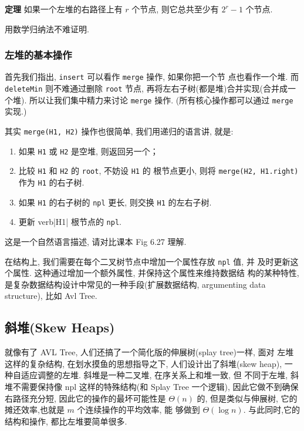 \documentclass[a4paper]{ctexart}
\theoremstyle{definition}
\theoremstyle{definition}
\begin{document}
{\bf 定理} 如果一个左堆的右路径上有 $r$ 个节点, 则它总共至少有 $2^r -
1$ 个节点.

用数学归纳法不难证明. 

\subsubsection{左堆的基本操作}

首先我们指出, \verb|insert| 可以看作 \verb|merge| 操作, 如果你把一个节
点也看作一个堆. 而 \verb|deleteMin| 则不难通过删除 \verb|root| 节点,
再将左右子树(都是堆)合并实现(合并成一个堆). 所以让我们集中精力来讨论
\verb|merge| 操作. (所有核心操作都可以通过 \verb|merge| 实现.)

其实 \verb|merge(H1, H2)| 操作也很简单, 我们用递归的语言讲, 就是:

\begin{enumerate}
\item 如果 \verb|H1| 或 \verb|H2| 是空堆, 则返回另一个；
\item 比较 \verb|H1| 和 \verb|H2| 的 \verb|root|, 不妨设 \verb|H1| 的
  根节点更小, 则将 \verb|merge(H2, H1.right)| 作为 \verb|H1| 的右子树.
\item 如果 \verb|H1| 的右子树的 \verb|npl| 更长, 则交换 \verb|H1| 的左右子树.
\item 更新 verb|H1| 根节点的 \verb|npl|.
\end{enumerate}

这是一个自然语言描述, 请对比课本 Fig 6.27 理解. 

在结构上, 我们需要在每个二叉树节点中增加一个属性存放 \verb|npl| 值, 并
及时更新这个属性. 这种通过增加一个额外属性, 并保持这个属性来维持数据结
构的某种特性, 是复杂数据结构设计中常见的一种手段(扩展数据结构,
argumenting data structure), 比如 Avl Tree.

\subsection{斜堆(Skew Heaps)}

就像有了 AVL Tree, 人们还搞了一个简化版的伸展树(splay tree)一样, 面对
左堆这样的复杂结构, 在划水摸鱼的思想指导之下, 人们设计出了斜堆(skew
heap), 一种自适应调整的左堆. 斜堆是一种二叉堆, 在序关系上和堆一致, 但
不同于左堆, 斜堆不需要保持像 npl 这样的特殊结构(和 Splay Tree 一个逻辑),
因此它做不到确保右路径充分短, 因此它的操作的最坏可能性是 $\Theta(n)$
的, 但是类似与伸展树, 它的摊还效率,也就是 $m$ 个连续操作的平均效率, 能
够做到 $\Theta(\log n)$. 与此同时,它的结构和操作, 都比左堆要简单很多.
\end{document}

